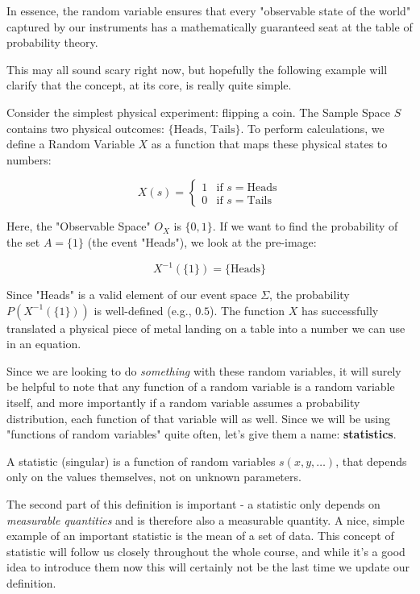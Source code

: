 In essence, the random variable ensures that every "observable state of the world" captured by our instruments has a mathematically guaranteed seat at the table of probability theory.

This may all sound scary right now, but hopefully the following example will clarify that the concept, at its core, is really quite simple. 

\begin{example}
	Consider the simplest physical experiment: flipping a coin. The Sample Space $S$ contains two physical outcomes: $\{\text{Heads,}$ $\text{Tails}\}$. To perform calculations, we define a Random Variable $X$ as a function that maps these physical states to numbers:
	
	\[
	X(s) = \begin{cases} 1 & \text{if } s = \text{Heads} \\ 0 & \text{if } s = \text{Tails} \end{cases}
	\]
	
	Here, the "Observable Space" $O_X$ is $\{0, 1\}$. If we want to find the probability of the set $A = \{1\}$ (the event "Heads"), we look at the pre-image:
	
	
	\[
	X^{-1}(\{1\}) = \{\text{Heads}\}
	\]
	
	Since "Heads" is a valid element of our event space $\Sigma$, the probability $P(X^{-1}(\{1\}))$ is well-defined (e.g., $0.5$). The function $X$ has successfully translated a physical piece of metal landing on a table into a number we can use in an equation.
\end{example}

Since we are looking to do \emph{something} with these random variables, it will surely be helpful to note that any function of a random variable is a random variable itself, and more importantly if a random variable assumes a probability distribution, each function of that variable will as well. Since we will be using "functions of random variables" quite often, let's give them a name: \textbf{statistics}.
\begin{definition}[Statistic]
	A statistic (singular) is a function of random variables $s(x,y,\dots)$, that depends only on the values themselves, not on unknown parameters. 
\end{definition}

The second part of this definition is important - a statistic only depends on \emph{measurable quantities} and is therefore also a measurable quantity. A nice, simple example of an important statistic is the mean of a set of data. This concept of statistic will follow us closely throughout the whole course, and while it's a good idea to introduce them now this will certainly not be the last time we update our definition.

